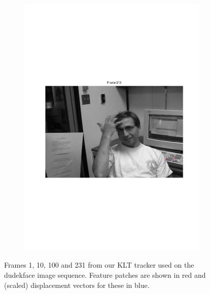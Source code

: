 \documentclass[11pt,a4paper]{article}
\begin{document}
\begin{figure}[H]
\begin{subfigure}{0.45\textwidth}
        \includegraphics[scale=0.4,trim={70 250 90 250}]{img/tracker_dudekface_213.pdf}
    \end{subfigure}
    \caption{Frames 1, 10, 100 and 231 from our KLT tracker used on the
        dudekface image sequence. Feature patches are shown in red and (scaled)
        displacement vectors for these in blue.}
    \label{fig:tracker_dudekface}
\end{figure}
\end{document}
